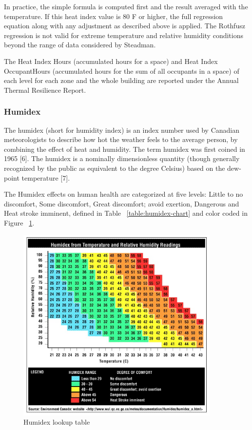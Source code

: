 In practice, the simple formula is computed first and the result averaged with the temperature. If this heat index value is 80 \degree F or higher, the full regression equation along with any adjustment as described above is applied. The Rothfusz regression is not valid for extreme temperature and relative humidity conditions beyond the range of data considered by Steadman.

The Heat Index Hours (accumulated hours for a space) and Heat Index OccupantHours (accumulated hours for the sum of all occupants in a space) of each level for each zone and the whole building are reported under the Annual Thermal Resilience Report.

\subsubsection{Humidex}\label{humidex}

The humidex (short for humidity index) is an index number used by Canadian meteorologists to describe how hot the weather feels to the average person, by combining the effect of heat and humidity. The term humidex was first coined in 1965 [6]. The humidex is a nominally dimensionless quantity (though generally recognized by the public as equivalent to the degree Celsius) based on the dew-point temperature [7].

The Humidex effects on human health are categorized at five levels: Little to no discomfort, Some discomfort, Great discomfort; avoid exertion, Dangerous and Heat stroke imminent, defined in Table ~\ref{table:humidex-chart} and color coded in Figure ~\ref{fig:humidex-lookup-table}.

\begin{figure}[hbtp] 
\centering
\includegraphics[width=0.9\textwidth, height=0.9\textheight, keepaspectratio=true]{media/humidex_chart.jpg}
\caption{Humidex lookup table \protect \label{fig:humidex-lookup-table}}
\end{figure}

